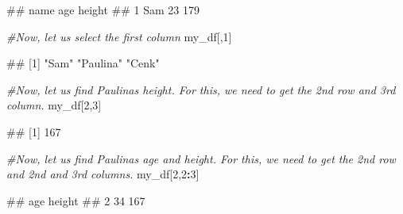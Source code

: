 \documentclass[
]{book}
\newenvironment{Shaded}{\begin{snugshade}}{\end{snugshade}}
\newcommand{\CommentTok}[1]{\textcolor[rgb]{0.56,0.35,0.01}{\textit{#1}}}
\newcommand{\DecValTok}[1]{\textcolor[rgb]{0.00,0.00,0.81}{#1}}
\newcommand{\NormalTok}[1]{#1}
\newcommand{\SpecialCharTok}[1]{\textcolor[rgb]{0.81,0.36,0.00}{\textbf{#1}}}
\begin{document}
\begin{Shaded}
\begin{Highlighting}[]
\NormalTok{\#\#   name age height}
\NormalTok{\#\# 1  Sam  23    179}
\end{Highlighting}
\end{Shaded}

\begin{Shaded}
\begin{Highlighting}[]
\CommentTok{\#Now, let us select the first column }
\NormalTok{my\_df[,}\DecValTok{1}\NormalTok{]}
\end{Highlighting}
\end{Shaded}

\begin{Shaded}
\begin{Highlighting}[]
\NormalTok{\#\# [1] "Sam"     "Paulina" "Cenk"}
\end{Highlighting}
\end{Shaded}

\begin{Shaded}
\begin{Highlighting}[]
\CommentTok{\#Now, let us find Paulina\textquotesingle{}s height. For this, we need to get the 2nd row and 3rd column.}
\NormalTok{my\_df[}\DecValTok{2}\NormalTok{,}\DecValTok{3}\NormalTok{]}
\end{Highlighting}
\end{Shaded}

\begin{Shaded}
\begin{Highlighting}[]
\NormalTok{\#\# [1] 167}
\end{Highlighting}
\end{Shaded}

\begin{Shaded}
\begin{Highlighting}[]
\CommentTok{\#Now, let us find Paulina\textquotesingle{}s age and height. For this, we need to get the 2nd row and 2nd and 3rd columns.}
\NormalTok{my\_df[}\DecValTok{2}\NormalTok{,}\DecValTok{2}\SpecialCharTok{:}\DecValTok{3}\NormalTok{]}
\end{Highlighting}
\end{Shaded}

\begin{Shaded}
\begin{Highlighting}[]
\NormalTok{\#\#   age height}
\NormalTok{\#\# 2  34    167}
\end{Highlighting}
\end{Shaded}
\end{document}
